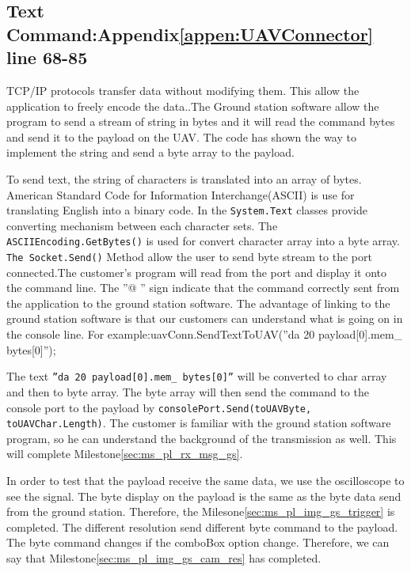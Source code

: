 \subsection{Text Command:Appendix\ref{appen:UAVConnector} line 68-85}
TCP/IP protocols transfer data without modifying them. This allow the application to freely encode the data.\cite{davidB}.The Ground station software allow the program to send a stream of string in bytes and it will read the command bytes and send it to the payload on the UAV. The code has shown the way to implement the string and send a byte array to the payload.

To send text, the string of characters is translated into an array of bytes. American Standard Code for Information Interchange(ASCII) is use for translating English into a binary code. In the \texttt{System.Text} classes provide converting mechanism between each character sets. The \texttt{ASCIIEncoding.GetBytes()} is used for convert character array into a byte array.  
\texttt{The Socket.Send()} Method allow the user to send byte stream to the port connected.The customer's program will read from the port and display it onto the command line. The ''@ '' sign indicate that the command correctly sent from the application to the ground station software. The advantage of linking to the ground station software is that our customers can understand what is going on in the console line. For example:uavConn.SendTextToUAV(''da 20 payload[0].mem\_ bytes[0]'');


The text \texttt{''da 20 payload[0].mem\_ bytes[0]''} will be converted to char array and then to byte array. The byte array will then send the command to the console port to the payload by \texttt{consolePort.Send(toUAVByte, toUAVChar.Length)}. The customer is familiar with the ground station software program, so he can understand the background of the transmission as well. This will complete Milestone\ref{sec:ms_pl_rx_msg_gs}.

In order to test that the payload receive the same data, we use the oscilloscope to see the signal. The byte display on the payload is the same as the byte data send from the ground station. Therefore, the Milesone\ref{sec:ms_pl_img_gs_trigger} is completed. The different resolution send different byte command to the payload. The byte command changes if the comboBox option change. Therefore, we can say that Milestone\ref{sec:ms_pl_img_gs_cam_res} has completed.

